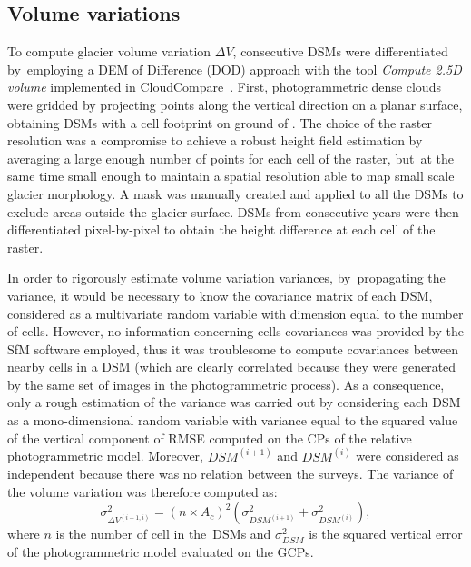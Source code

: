 \subsection{Volume variations}\label{sec:3:method_volumes}

To compute glacier volume variation $ \Delta V $, consecutive DSMs were differentiated
by~employing a DEM of Difference (DOD) approach with the tool \textit{Compute 2.5D volume} implemented in CloudCompare~\citep{cloudcompare}.
First, photogrammetric dense clouds were gridded by projecting points along the vertical
direction on a planar surface, obtaining DSMs with a cell footprint on ground of .
The choice of the raster resolution was a compromise to achieve a robust height field
estimation by averaging a large enough number of points for each cell of the raster,
but~at the same time small enough to maintain a spatial resolution able to map small
scale glacier morphology.
A mask was manually created and applied to all the DSMs to exclude areas outside the
glacier surface.
DSMs from consecutive years were then differentiated pixel-by-pixel to obtain the height
difference at each cell of the raster.

In order to rigorously estimate volume variation variances, by~propagating the variance,
it would be  necessary to know the covariance matrix of each DSM, considered as a
multivariate random variable with dimension equal to the number of cells.
However, no information concerning cells covariances was provided by the SfM software
employed, thus it was troublesome to compute covariances between nearby cells in a DSM
(which are clearly correlated because they were generated by the same set of images in
the photogrammetric process).
As a consequence, only a rough estimation of the variance was carried out by considering
each DSM as a mono-dimensional random variable with variance equal to the squared value
of the vertical component of RMSE computed on the CPs of the relative photogrammetric
model.
Moreover, $ DSM^{(i+1)} $ and $ DSM^{(i)} $ were considered as independent because there
was no relation between the surveys.
The variance of the volume variation was therefore computed as:
\begin{equation}
    \sigma^2_{\Delta V^{(i+1,i)}}  = {(n \times A_c)}^2 \left( \sigma^2
    _{DSM^{(i+1)}} + \sigma^2_{DSM^{(i)}} \right),
    \label{eq:3:volVarProp}
\end{equation}
where $ n $ is the number of cell in the~DSMs and $ \sigma^2 _{DSM}$ is the squared
vertical error of the photogrammetric model evaluated on the GCPs.

